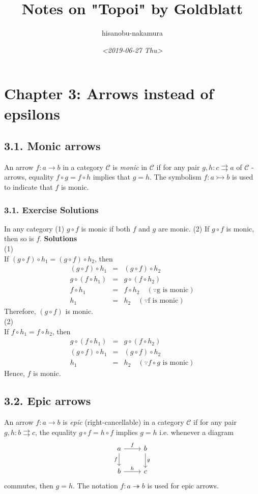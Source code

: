 \documentclass{article}
\author{hisanobu-nakamura}
\date{\textit{<2019-06-27 Thu>}}
\title{Notes on "Topoi" by Goldblatt}
\begin{document}
\maketitle
\tableofcontents


\section{Chapter 3: Arrows instead of epsilons}
\label{sec:org385a140}
\subsection{3.1. Monic arrows}
\label{sec:orgb723978}
An arrow \(f:a \rightarrow b\) in a category \(\mathcal{C}\) is  \emph{monic} in \(\mathcal{C}\) if for any pair \(g,h:c \rightrightarrows a\) of \(\mathcal{C}\) -arrows, equality \(f\circ g = f \circ h\) implies that \(g=h\).
The symbolism \(f:a \rightarrowtail b\) is used to indicate that \(f\) is monic.
\subsubsection{3.1. Exercise Solutions}
\label{sec:org249d0f7}
In any category
(1) \(g \circ f\) is monic if both \(f\) and \(g\) are monic.
(2) If \(g \circ f\) is monic, then so is \(f\).
\textbf{Solutions} \\
(1) \\
If \((g \circ f) \circ h_{1} = (g \circ f) \circ h_{2}\), then 
\begin{eqnarray*}
(g \circ f) \circ h_{1} &=& (g \circ f) \circ h_{2}\\
g \circ (f \circ h_{1}) &=& g \circ (f \circ h_{2})\\
f \circ h_{1} &=& f \circ h_{2}  \quad (\because \text{g is monic})\\
h_{1} &=& h_{2}  \quad (\because \text{f is monic})
\end{eqnarray*}
Therefore, \((g \circ f)\) is monic. \\
(2) \\
If \(f \circ h_{1} = f \circ h_{2}\), then 
\begin{eqnarray*}
g \circ (f \circ h_{1}) &=& g \circ (f \circ h_{2})\\
(g \circ f) \circ h_{1} &=& (g \circ f) \circ h_{2}\\
h_{1} &=& h_{2}  \quad (\because \text{$f \circ g$ is monic})
\end{eqnarray*}
Hence, \(f\) is monic.

\subsection{3.2. Epic arrows}
\label{sec:org0477e1d}
An arrow \(f: a \rightarrow b\) is \emph{epic} (right-cancellable) in a category \(\mathcal{C}\) if for any pair \(g,h:b \rightrightarrows c\), the equality \(g \circ f = h \circ f\) implies \(g=h\) i.e. whenever a diagram
\[ \begin{tikzcd}
a \arrow{r}{f} \arrow[swap]{d}{f} & b \arrow{d}{g} \\%
b \arrow{r}{h}& c
\end{tikzcd}
\]
commutes, then \(g=h\). The notation \(f:a \twoheadrightarrow b\) is used for epic arrows.
\end{document}
